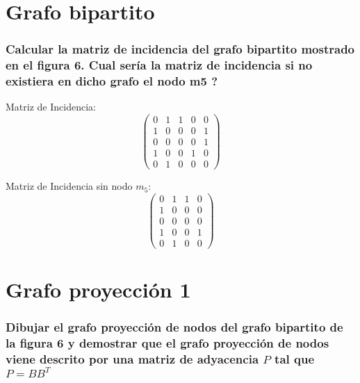 \section{Grafo bipartito}
\subsubsection{\large Calcular la matriz de incidencia del grafo bipartito mostrado en el figura 6. Cual sería la matriz de incidencia si no existiera en dicho grafo el nodo m5 ?}


Matriz de Incidencia:
$$\begin{pmatrix}
0 & 1 & 1 & 0 & 0 \\ 
1 & 0 & 0 & 0 & 1 \\ 
0 & 0 & 0 & 0 & 1 \\ 
1 & 0 & 0 & 1 & 0 \\ 
0 & 1 & 0 & 0 & 0
\end{pmatrix}$$ 

Matriz de Incidencia sin nodo $m_5$:
$$\begin{pmatrix}
0 & 1 & 1 & 0  \\ 
1 & 0 & 0 & 0  \\ 
0 & 0 & 0 & 0  \\ 
1 & 0 & 0 & 1  \\ 
0 & 1 & 0 & 0 
\end{pmatrix}$$ 



\section{Grafo proyección 1}
\subsubsection{\large Dibujar el grafo proyección de nodos del grafo bipartito de la figura 6 y demostrar que el grafo proyección de nodos viene descrito por una matriz de adyacencia $P$ tal que $P = BB^T$}

\begin {center}
\end{center}

